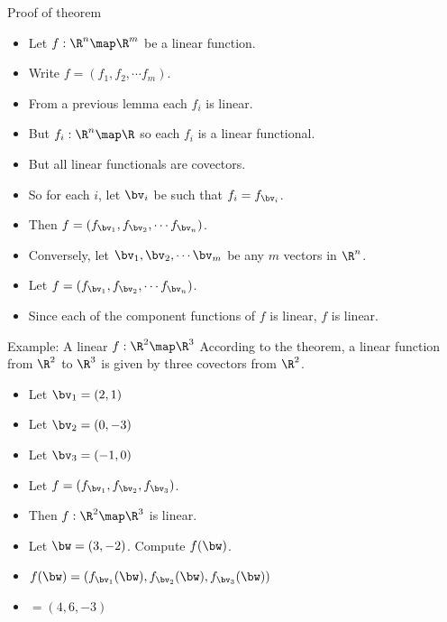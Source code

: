 \documentclass{beamer}
\begin{document}
\begin{frame}{Proof of theorem}

\begin{itemize}
\item Let $f:\R^n\map\R^m$ be a linear function.
\item Write $f = (f_1, f_2, \cdots f_m)$.
\item From a previous lemma each $f_i$ is linear.
\item But $f_i:\R^n\map\R$ so each $f_i$ is a linear functional.
\item But all linear functionals are covectors.
\item So for each $i$, let $\bv_i$ be such that $f_i = f_{\bv_i}$.
\item Then $f=(f_{\bv_1}, f_{\bv_2},\cdots f_{\bv_n})$.
\item Conversely, let $\bv_1,\bv_2,\cdots\bv_m$ be any $m$ vectors in $\R^n$.
\item Let $f=(f_{\bv_1}, f_{\bv_2},\cdots f_{\bv_n})$.
\item Since each of the component functions of $f$ is linear, $f$ is linear.
\end{itemize}


\end{frame}

\begin{frame}{Example: A linear $f:\R^2\map\R^3$}
According to the theorem, a linear function from $\R^2$ to $\R^3$ is
given by three covectors from $\R^2$.

\begin{itemize}
\item Let $\bv_1 = (2, 1)$
\item Let $\bv_2 = (0, -3)$
\item Let $\bv_3 = (-1, 0)$
\item Let $f = (f_{\bv_1},f_{\bv_2},f_{\bv_3})$.
\item Then $f:\R^2\map\R^3$ is linear.
\item Let $\bw = (3, -2)$. Compute $f(\bw)$.
\item $f(\bw) = \left(f_{\bv_1}(\bw),f_{\bv_2}(\bw),f_{\bv_3}(\bw)\right)$
\item $=(4, 6, -3)$
\end{itemize}

\end{frame}
\end{document}
